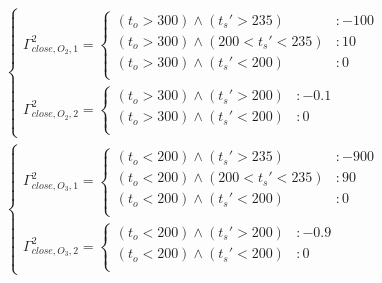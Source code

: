 \documentclass{article}
\begin{document}
\begin{align*}
\begin{cases}
\Gamma_{close,O_2,1}^2= 
\begin{cases}
(t_o>300) \wedge (t_s'>235) &: -100 \\
(t_o>300)\wedge (200<t_s'<235) &: 10 \\
(t_o>300) \wedge (t_s'<200) &: 0 \\
\end{cases}
\\
\Gamma_{close,O_2,2}^2= 
\begin{cases}
(t_o>300)\wedge (t_s'>200) &: -0.1 \\
(t_o>300) \wedge (t_s'<200) &: 0 \\
\end{cases}
\end{cases}
\\
\begin{cases}
\Gamma_{close,O_3,1}^2= 
\begin{cases}
(t_o<200) \wedge (t_s'>235) &: -900 \\
(t_o<200)\wedge (200<t_s'<235) &: 90 \\
(t_o<200) \wedge (t_s'<200) &: 0 \\
\end{cases}
\\
\Gamma_{close,O_3,2}^2= 
\begin{cases}
(t_o<200) \wedge (t_s'>200) &: -0.9 \\
(t_o<200)\wedge (t_s'<200) &: 0 \\
\end{cases}
\end{cases}
\end{align*}
\end{document}
